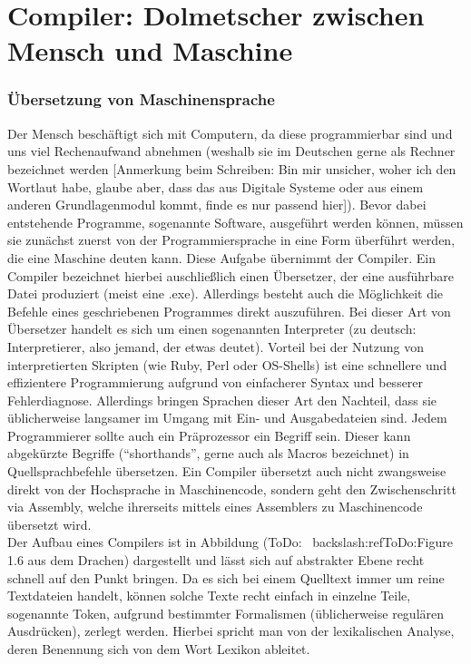 \documentclass{standalone}
\begin{document}


\chapter{Compiler: Dolmetscher zwischen Mensch und Maschine}
\subsection{Übersetzung von Maschinensprache}

Der Mensch beschäftigt sich mit Computern, da diese programmierbar sind und uns viel Rechenaufwand abnehmen (weshalb sie im Deutschen gerne als Rechner bezeichnet werden [Anmerkung beim Schreiben: Bin mir unsicher, woher ich den Wortlaut habe, glaube aber, dass das aus Digitale Systeme oder aus einem anderen Grundlagenmodul kommt, finde es nur passend hier]). 
Bevor dabei entstehende Programme, sogenannte Software, ausgeführt werden können, müssen sie zunächst zuerst von der Programmiersprache in eine Form überführt werden, die eine Maschine deuten kann. Diese Aufgabe übernimmt der Compiler. %
Ein Compiler bezeichnet hierbei auschließlich einen Übersetzer, der eine ausführbare Datei produziert (meist eine .exe). Allerdings besteht auch die Möglichkeit die Befehle eines geschriebenen Programmes direkt auszuführen. Bei dieser Art von Übersetzer handelt es sich um einen sogenannten Interpreter (zu deutsch: Interpretierer, also jemand, der etwas deutet). 
Vorteil bei der Nutzung von interpretierten Skripten (wie Ruby, Perl oder OS-Shells) ist eine schnellere und effizientere Programmierung aufgrund von einfacherer Syntax und besserer Fehlerdiagnose. Allerdings bringen Sprachen dieser Art den Nachteil, dass sie üblicherweise langsamer im Umgang mit Ein- und Ausgabedateien sind. %
Jedem Programmierer sollte auch ein Präprozessor ein Begriff sein. Dieser kann abgekürzte Begriffe (\enquote{shorthands}, gerne auch als Macros bezeichnet) in Quellsprachbefehle übersetzen. 
Ein Compiler übersetzt auch nicht zwangsweise direkt von der Hochsprache in Maschinencode, sondern geht den Zwischenschritt via Assembly, welche ihrerseits mittels eines Assemblers zu Maschinencode übersetzt wird. 
\\
Der Aufbau eines Compilers ist in Abbildung (ToDo: ~backslash:ref{ToDo:Figure 1.6 aus dem Drachen}) dargestellt und lässt sich auf abstrakter Ebene recht schnell auf den Punkt bringen. Da es sich bei einem Quelltext immer um reine Textdateien handelt, können solche Texte recht einfach in einzelne Teile, sogenannte Token, aufgrund bestimmter Formalismen (üblicherweise regulären Ausdrücken), zerlegt werden. Hierbei spricht man von der lexikalischen Analyse, deren Benennung sich von dem Wort Lexikon ableitet. 
\end{document}
